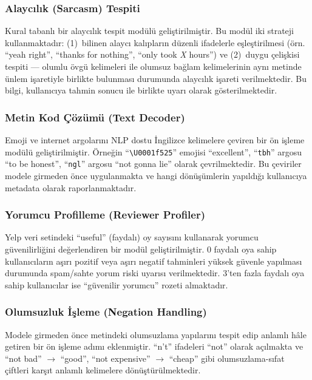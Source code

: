 \documentclass[conference]{IEEEtran}
\begin{document}
\subsubsection{Alaycılık (Sarcasm) Tespiti}
Kural tabanlı bir alaycılık tespit modülü geliştirilmiştir. Bu modül iki strateji kullanmaktadır: (1)~bilinen alaycı kalıpların düzenli ifadelerle eşleştirilmesi (örn. ``yeah right'', ``thanks for nothing'', ``only took \textit{X} hours'') ve (2)~duygu çelişkisi tespiti --- olumlu övgü kelimeleri ile olumsuz bağlam kelimelerinin aynı metinde ünlem işaretiyle birlikte bulunması durumunda alaycılık işareti verilmektedir. Bu bilgi, kullanıcıya tahmin sonucu ile birlikte uyarı olarak gösterilmektedir.

\subsubsection{Metin Kod Çözümü (Text Decoder)}
Emoji ve internet argolarını NLP dostu İngilizce kelimelere çeviren bir ön işleme modülü geliştirilmiştir. Örneğin ``\texttt{\textbackslash U0001f525}'' emojisi ``excellent'', ``\texttt{tbh}'' argosu ``to be honest'', ``\texttt{ngl}'' argosu ``not gonna lie'' olarak çevrilmektedir. Bu çeviriler modele girmeden önce uygulanmakta ve hangi dönüşümlerin yapıldığı kullanıcıya metadata olarak raporlanmaktadır.

\subsubsection{Yorumcu Profilleme (Reviewer Profiler)}
Yelp veri setindeki ``useful'' (faydalı) oy sayısını kullanarak yorumcu güvenilirliğini değerlendiren bir modül geliştirilmiştir. 0 faydalı oya sahip kullanıcıların aşırı pozitif veya aşırı negatif tahminleri yüksek güvenle yapılması durumunda spam/sahte yorum riski uyarısı verilmektedir. 3'ten fazla faydalı oya sahip kullanıcılar ise ``güvenilir yorumcu'' rozeti almaktadır.

\subsubsection{Olumsuzluk İşleme (Negation Handling)}
Modele girmeden önce metindeki olumsuzlama yapılarını tespit edip anlamlı hâle getiren bir ön işleme adımı eklenmiştir. ``n't'' ifadeleri ``not'' olarak açılmakta ve ``not bad'' $\rightarrow$ ``good'', ``not expensive'' $\rightarrow$ ``cheap'' gibi olumsuzlama-sıfat çiftleri karşıt anlamlı kelimelere dönüştürülmektedir.
\end{document}
